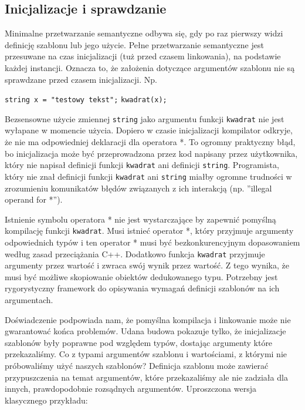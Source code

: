 \documentclass[11pt, a4paper]{article}
\begin{document}
\lstset{language=C++}

\subsection{Inicjalizacje i sprawdzanie}

Minimalne przetwarzanie semantyczne odbywa się, gdy po raz pierwszy widzi definicję szablonu lub jego użycie. Pełne przetwarzanie semantyczne jest przesuwane na czas inicjalizacji (tuż przed czasem linkowania), na podstawie każdej instancji. Oznacza to, że założenia dotyczące argumentów szablonu nie są sprawdzane przed czasem inicjalizacji. Np.\newline

\noindent \verb#string x = "testowy tekst";# \newline
\verb#kwadrat(x);# \newline

Bezsensowne użycie zmiennej \verb#string# jako argumentu funkcji \verb#kwadrat# nie jest wyłapane w momencie użycia. Dopiero w czasie inicjalizacji kompilator odkryje, że nie ma odpowiedniej deklaracji dla operatora *. To ogromny praktyczny błąd, bo inicjalizacja może być przeprowadzona przez kod napisany przez użytkownika, który nie napisał definicji funkcji \verb#kwadrat# ani definicji \verb#string#. Programista, który nie znał definicji funkcji \verb#kwadrat# ani \verb#string# miałby ogromne trudności w zrozumieniu komunikatów błędów związanych z ich interakcją (np. ”illegal operand for *”).

Istnienie symbolu operatora * nie jest wystarczające by zapewnić pomyślną kompilację funkcji \verb#kwadrat#. Musi istnieć operator *, który przyjmuje argumenty odpowiednich typów i ten operator * musi być bezkonkurencyjnym dopasowaniem według zasad przeciążania C++. Dodatkowo funkcja \verb#kwadrat# przyjmuje argumenty przez wartość i zwraca swój wynik przez wartość. Z tego wynika, że musi być możliwe skopiowanie obiektów dedukowanego typu. Potrzebny jest rygorystyczny framework do opisywania wymagań definicji szablonów na ich argumentach.

Doświadczenie podpowiada nam, że pomyślna kompilacja i linkowanie może nie gwarantować końca problemów. Udana budowa pokazuje tylko, że inicjalizacje szablonów były poprawne pod względem typów, dostając argumenty które przekazaliśmy. Co z typami argumentów szablonu i wartościami, z którymi nie próbowaliśmy użyć naszych szablonów? Definicja szablonu może zawierać przypuszczenia na temat argumentów, które przekazaliśmy ale nie zadziała dla innych, prawdopodobnie rozsądnych argumentów. Uproszczona wersja klasycznego przykładu:
\end{document}
